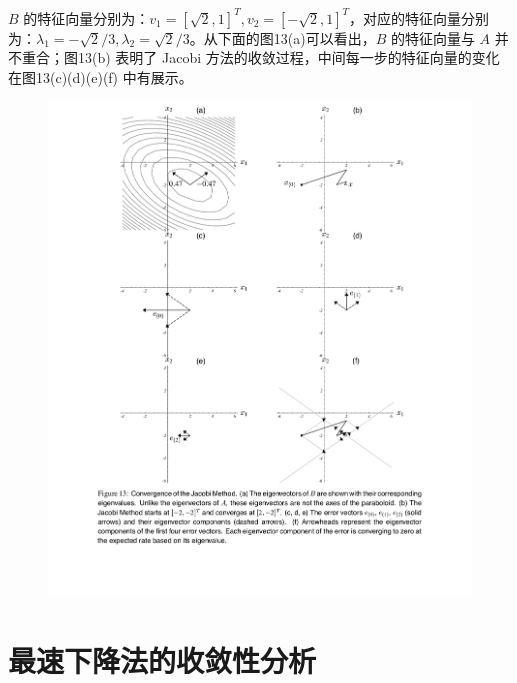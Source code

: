\documentclass[12pt]{article}
\begin{document}
$B$ 的特征向量分别为：$v_1 = [\sqrt{2}, 1]^T, v_2 = [-\sqrt{2}, 1]^T$，对应的特征向量分别为：$\lambda_1 = -\sqrt{2}/3, \lambda_2 = \sqrt{2}/3$。从下面的图13(a)可以看出，$B$ 的特征向量与 $A$ 并不重合；图13(b) 表明了 Jacobi 方法的收敛过程，中间每一步的特征向量的变化在图13(c)(d)(e)(f) 中有展示。
\begin{figure}[H]
    \centering
    \includegraphics[width=1\textwidth]{fig/CG_Convergence_Jacobi.png}
\end{figure}

\section{最速下降法的收敛性分析}



\end{document}
